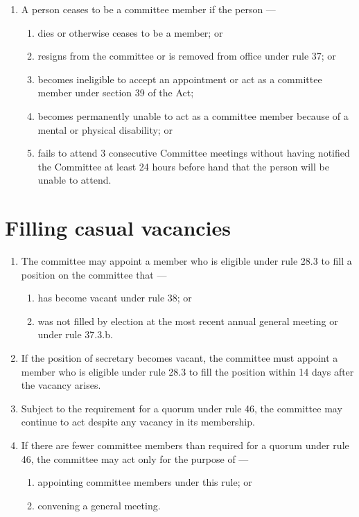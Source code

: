 \begin{enumerate}

\item A person ceases to be a committee member if the person ---

  \begin{enumerate}
  
  \item dies or otherwise ceases to be a member; or
  \item resigns from the committee or is removed from office under rule 37; or
  \item becomes ineligible to accept an appointment or act as a committee member under section 39 of the Act;
  \item becomes permanently unable to act as a committee member because of a mental or physical disability; or
  \item fails to attend 3 consecutive Committee meetings without having notified the Committee at least 24 hours before hand that the person will be unable to attend.
  \end{enumerate}
\end{enumerate}

\hypertarget{filling-casual-vacancies}{%
\section{Filling casual vacancies}\label{filling-casual-vacancies}}

\begin{enumerate}

\item The committee may appoint a member who is eligible under rule 28.3 to fill a position on the committee that ---

  \begin{enumerate}
  
  \item has become vacant under rule 38; or
  \item was not filled by election at the most recent annual general meeting or under rule 37.3.b.
  \end{enumerate}
\item If the position of secretary becomes vacant, the committee must appoint a member who is eligible under rule 28.3 to fill the position within 14 days after the vacancy arises.
\item Subject to the requirement for a quorum under rule 46, the committee may continue to act despite any vacancy in its membership.
\item If there are fewer committee members than required for a quorum under rule 46, the committee may act only for the purpose of ---

  \begin{enumerate}
  
  \item appointing committee members under this rule; or
  \item convening a general meeting.
  \end{enumerate}
\end{enumerate}

